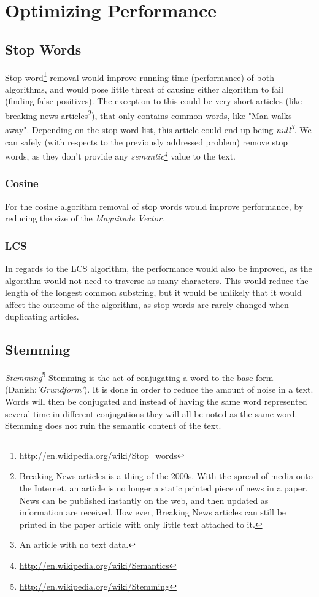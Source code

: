 \section{Optimizing Performance}
\subsection{Stop Words}
Stop word\footnote{\url{http://en.wikipedia.org/wiki/Stop_words}} removal would improve running time (performance) of both algorithms, and would pose little threat of causing either algorithm to fail (finding false positives). The exception to this could be very short articles (like breaking news articles\footnote{Breaking News articles is a thing of the 2000s. With the spread of media onto the Internet, an article is no longer a static printed piece of news in a paper. News can be published instantly on the web, and then updated as information are received. How ever, Breaking News articles can still be printed in the paper article with only little text attached to it.}), that only contains common words, like "Man walks away". Depending on the stop word list, this article could end up being \textit{null\footnote{An article with no text data.}}.
We can safely (with respects to the previously addressed problem) remove stop words, as they don't provide any \textit{semantic\footnote{\url{http://en.wikipedia.org/wiki/Semantics}}} value to the text.

\subsubsection{Cosine}
For the cosine algorithm removal of stop words would improve performance, by reducing the size of the \textit{Magnitude Vector}. 

\subsubsection{LCS}
In regards to the LCS algorithm, the performance would also be improved, as the algorithm would not need to traverse as many characters. This would reduce the length of the longest common substring, but it would be unlikely that it would affect the outcome of the algorithm, as stop words are rarely changed when duplicating articles.

\subsection{Stemming}
\textit{Stemming}\footnote{\url{http://en.wikipedia.org/wiki/Stemming}} Stemming is the act of conjugating a word to the base form (Danish:\textit{'Grundform'}). It is done in order to reduce the amount of noise in a text. Words will then be conjugated and instead of having the same word represented several time in different conjugations they will all be noted as the same word. Stemming does not ruin the semantic content of the text.

